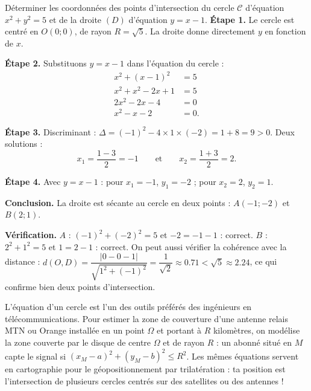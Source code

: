 \documentclass[11pt]{article}
\begin{document}
\begin{exoresolu}[Points d'intersection de $\mathcal{C} : x^2 + y^2 = 5$ et $(D) : y = x - 1$]
Déterminer les coordonnées des points d'intersection du cercle $\mathcal{C}$ d'équation $x^2 + y^2 = 5$ et de la droite $(D)$ d'équation $y = x - 1$.
\tcblower
\textbf{Étape 1.} Le cercle est centré en $O(0 ; 0)$, de rayon $R = \sqrt{5}$. La droite donne directement $y$ en fonction de $x$.

\textbf{Étape 2.} Substituons $y = x - 1$ dans l'équation du cercle :
\begin{align*}
x^2 + (x-1)^2 &= 5 \\
x^2 + x^2 - 2x + 1 &= 5 \\
2x^2 - 2x - 4 &= 0 \\
x^2 - x - 2 &= 0.
\end{align*}

\textbf{Étape 3.} Discriminant : $\Delta = (-1)^2 - 4 \times 1 \times (-2) = 1 + 8 = 9 > 0$. Deux solutions :
\[ x_1 = \frac{1 - 3}{2} = -1 \qquad \text{et} \qquad x_2 = \frac{1 + 3}{2} = 2. \]

\textbf{Étape 4.} Avec $y = x - 1$ : pour $x_1 = -1$, $y_1 = -2$ ; pour $x_2 = 2$, $y_2 = 1$.

\textbf{Conclusion.} La droite est sécante au cercle en deux points : $A(-1 ; -2)$ et $B(2 ; 1)$.

\textbf{Vérification.} $A$ : $(-1)^2 + (-2)^2 = 5$ et $-2 = -1 - 1$ : correct. $B$ : $2^2 + 1^2 = 5$ et $1 = 2 - 1$ : correct. On peut aussi vérifier la cohérence avec la distance : $d(O, D) = \dfrac{|0 - 0 - 1|}{\sqrt{1^2+(-1)^2}} = \dfrac{1}{\sqrt{2}} \approx \num{0,71} < \sqrt{5} \approx \num{2,24}$, ce qui confirme bien deux points d'intersection.
\end{exoresolu}

\begin{savaistu}
L'équation d'un cercle est l'un des outils préférés des ingénieurs en télécommunications. Pour estimer la zone de couverture d'une antenne relais MTN ou Orange installée en un point $\Omega$ et portant à $R$ kilomètres, on modélise la zone couverte par le disque de centre $\Omega$ et de rayon $R$ : un abonné situé en $M$ capte le signal si $(x_M - a)^2 + (y_M - b)^2 \leq R^2$. Les mêmes équations servent en cartographie pour le géopositionnement par trilatération : ta position est l'intersection de plusieurs cercles centrés sur des satellites ou des antennes !
\end{savaistu}
\end{document}
